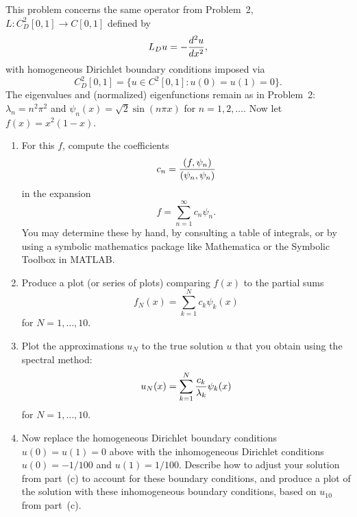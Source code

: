 This problem concerns the same operator from Problem~2, $L: C^2_D[0,1]\to C[0,1]$ defined by
\[ L_D u = -{d^2 u \over dx^2},\]
with homogeneous Dirichlet boundary conditions imposed via
\[ C^2_D[0,1] = \{ u \in C^2[0,1] : u(0) = u(1) = 0\}.\]
The eigenvalues and (normalized) eigenfunctions remain as in Problem~2:
$\lambda_n = n^2 \pi^2$ and $\psi_n(x) = \sqrt{2} \sin(n \pi x)$ for 
$n=1,2,\ldots.$ Now let $f(x) = x^2(1-x)$.
\begin{enumerate}
   \item For this $f$, compute the coefficients 
         \[ c_n = {(f,\psi_n)\over (\psi_n,\psi_n)} \]
         in the expansion
                \[ f = \sum_{n=1}^\infty c_n \psi_n.\]
         You may determine these by hand, by consulting a table of integrals,
         or by using a symbolic mathematics package like Mathematica
         or the Symbolic Toolbox in MATLAB.  

   \item Produce a plot (or series of plots) comparing $f(x)$ 
         to the partial sums 
               \[ f_N(x) = \sum_{k=1}^N c_k \psi_k(x)\]
         for $N=1, \ldots, 10$.

   \item Plot the approximations $u_N$ to the true solution $u$ 
         that you obtain using the spectral method:
               \[ u_N(x) = \sum_{k=1}^N {c_k \over \lambda_k} \psi_k(x)\]
         for $N=1, \ldots, 10$.

   \item Now replace the homogeneous Dirichlet boundary conditions $u(0) = u(1) = 0$ above
         with the inhomogeneous Dirichlet conditions $u(0) = -1/100$ and $u(1) = 1/100$.
         Describe how to adjust your solution from part~(c) to account for these
          boundary conditions, and produce a plot of the solution with these
          inhomogeneous boundary conditions, based on $u_{10}$ from part~(c).
\end{enumerate}

           


